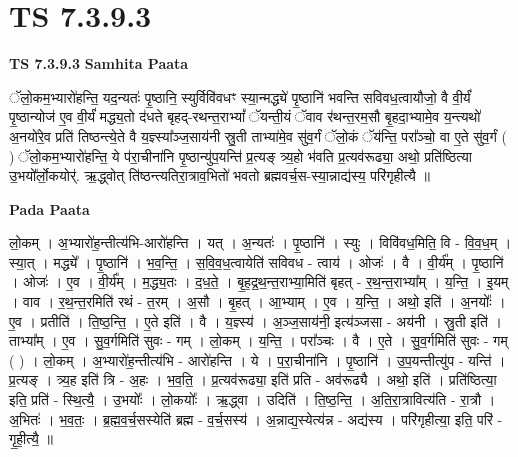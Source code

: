 \documentclass[17pt]{extarticle}
\begin{document}

\section{ TS 7.3.9.3 }

\textbf{TS 7.3.9.3 } \newline
\textbf{Samhita Paata} \newline

ॅलो॒कम॒भ्यारो॑हन्ति॒ यद॒न्यतः॑ पृ॒ष्ठानि॒ स्युर्विवि॑वधꣳ स्या॒न्मद्ध्ये॑ पृ॒ष्ठानि॑ भवन्ति सविवध॒त्वायौजो॒ वै वी॒र्यं॑ पृ॒ष्ठान्योज॑ ए॒व वी॒र्यं॑ मद्ध्य॒तो द॑धते बृहद्-रथन्त॒राभ्यां᳚ ॅयन्ती॒यं ॅवाव र॑थन्त॒रम॒सौ बृ॒हदा॒भ्यामे॒व य॒न्त्यथो॑ अ॒नयो॑रे॒व प्रति॑ तिष्ठन्त्ये॒ते वै य॒ज्ञ्स्या᳚ञ्ज॒साय॑नी स्रु॒ती ताभ्या॑मे॒व सु॑व॒र्गं ॅलो॒कं ॅय॑न्ति॒ परा᳚ञ्चो॒ वा ए॒ते सु॑व॒र्गं ( ) ॅलो॒कम॒भ्यारो॑हन्ति॒ ये प॑रा॒चीना॑नि पृ॒ष्ठान्यु॑प॒यन्ति॑ प्र॒त्यङ् त्र्य॒हो भ॑वति प्र॒त्यव॑रूढ्या॒ अथो॒ प्रति॑ष्ठित्या उ॒भयो᳚र्लो॒कयोर्॑. ऋ॒द्ध्वोत् ति॑ष्ठन्त्यतिरा॒त्राव॒भितो॑ भवतो ब्रह्मवर्च॒स-स्या॒न्नाद्य॑स्य॒ परि॑गृहीत्यै ॥ \newline

\textbf{Pada Paata} \newline

लो॒कम् । अ॒भ्यारो॑ह॒न्तीत्य॑भि-आरो॑हन्ति । यत् । अ॒न्यतः॑ । पृ॒ष्ठानि॑ । स्युः । विवि॑वध॒मिति॒ वि - वि॒व॒ध॒म् । स्या॒त् । मद्ध्ये᳚ । पृ॒ष्ठानि॑ । भ॒व॒न्ति॒ । स॒वि॒व॒ध॒त्वायेति॑ सविवध - त्वाय॑ । ओजः॑ । वै । वी॒र्य᳚म् । पृ॒ष्ठानि॑ । ओजः॑ । ए॒व । वी॒र्य᳚म् । म॒द्ध्य॒तः । द॒ध॒ते॒ । बृ॒ह॒द्र॒थ॒न्त॒राभ्या॒मिति॑ बृहत् - र॒थ॒न्त॒राभ्या᳚म् । य॒न्ति॒ । इ॒यम् । वाव । र॒थ॒न्त॒रमिति॑ रथं - त॒रम् । अ॒सौ । बृ॒हत् । आ॒भ्याम् । ए॒व । य॒न्ति॒ । अथो॒ इति॑ । अ॒नयोः᳚ । ए॒व । प्रतीति॑ । ति॒ष्ठ॒न्ति॒ । ए॒ते इति॑ । वै । य॒ज्ञ्स्य॑ । अ॒ञ्ज॒साय॑नी॒ इत्य॑ञ्जसा - अय॑नी । स्रु॒ती इति॑ । ताभ्या᳚म् । ए॒व । सु॒व॒र्गमिति॑ सुवः - गम् । लो॒कम् । य॒न्ति॒ । परा᳚ञ्चः । वै । ए॒ते । सु॒व॒र्गमिति॑ सुवः - गम् ( ) । लो॒कम् । अ॒भ्यारो॑ह॒न्तीत्य॑भि - आरो॑हन्ति । ये । प॒रा॒चीना॑नि । पृ॒ष्ठानि॑ । उ॒प॒यन्तीत्यु॑प - यन्ति॑ । प्र॒त्यङ् । त्र्य॒ह इति॑ त्रि - अ॒हः । भ॒व॒ति॒ । प्र॒त्यव॑रूढ्या॒ इति॑ प्रति - अव॑रूढ्यै । अथो॒ इति॑ । प्रति॑ष्ठित्या॒ इति॒ प्रति॑ - स्थि॒त्यै॒ । उ॒भयोः᳚ । लो॒कयोः᳚ । ऋ॒द्ध्वा । उदिति॑ । ति॒ष्ठ॒न्ति॒ । अ॒ति॒रा॒त्रावित्य॑ति - रा॒त्रौ । अ॒भितः॑ । भ॒व॒तः॒ । ब्र॒ह्म॒व॒र्च॒सस्येति॑ ब्रह्म - व॒र्च॒सस्य॑ । अ॒न्नाद्य॒स्येत्य॑न्न - अद्य॑स्य । परि॑गृहीत्या॒ इति॒ परि॑ - गृ॒ही॒त्यै॒ ॥  \newline
\end{document}
